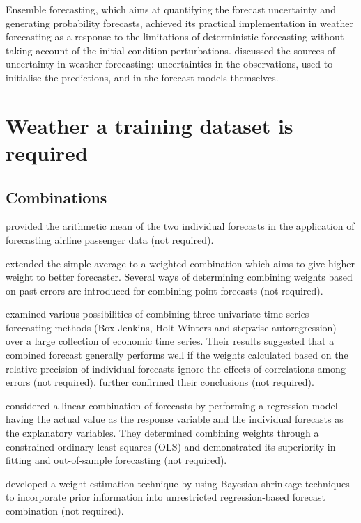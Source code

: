 \documentclass[11pt]{article}
\begin{document}
Ensemble forecasting, which aims at quantifying the forecast uncertainty and generating probability forecasts, achieved its practical implementation in weather forecasting as a response to the limitations of deterministic forecasting without taking account of the initial condition perturbations. \cite{leutbecher2008ensemble} discussed the sources of uncertainty in weather forecasting: uncertainties in the observations, used to initialise the predictions, and in the forecast models themselves.


\section{Weather a training dataset is required}

\subsection{Combinations}

\cite{barnard1963new} provided the arithmetic mean of the two individual forecasts in the application of forecasting airline passenger data (not required).

\cite{bates1969combination} extended the simple average to a weighted combination which aims to give higher weight to better forecaster. Several ways of determining combining weights based on past errors are introduced for combining point forecasts (not required).

\cite{newbold1974experience} examined various possibilities of combining three univariate time series forecasting methods (Box-Jenkins, Holt-Winters and stepwise autoregression) over a large collection of economic time series. Their results suggested that a combined forecast generally performs well if the weights calculated based on the relative precision of individual forecasts ignore the effects of correlations among errors (not required). \cite{winkler1983combination} further confirmed their conclusions (not required).

\cite{granger1984improved} considered a linear combination of forecasts by performing a regression model having the actual value as the response variable and the individual forecasts as the explanatory variables. They determined combining weights through a constrained ordinary least squares (OLS) and demonstrated its superiority in fitting and out-of-sample forecasting (not required).

\cite{diebold1990use} developed a weight estimation technique by using Bayesian shrinkage techniques to incorporate prior information into unrestricted regression-based forecast combination (not required).
\end{document}
